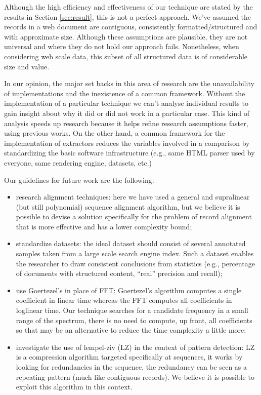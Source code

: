 \documentclass{vldb}
\begin{document}
Although the high efficiency and effectiveness of our technique are stated by
the results in Section \ref{sec:result}, this is not a perfect approach. We've
assumed the records in a web document are contiguous, consistently
formatted/structured and with approximate size. Although these assumptions are
plausible, they are not universal and where they do not hold our approach fails.
Nonetheless, when considering web scale data, this subset of all structured data
is of considerable size and value.

In our opinion, the major set backs in this area of research are the
unavailability of implementations and the inexistence of a common framework.
Without the implementation of a particular technique we can't analyse individual
results to gain insight about why it did or did not work in a particular case.
This kind of analysis speeds up research because it helps refine research
assumptions faster, using previous works. On the other hand, a common framework
for the implementation of extractors reduces the variables involved in a
comparison by standardizing the basic software infrastructure (e.g., same HTML
parser used by everyone, same rendering engine, datasets, etc.)
 
Our guidelines for future work are the following:
\begin{itemize}
  \item research alignment techniques: here we have used a general and
  supralinear (but still polynomial) sequence alignment algorithm, but we
  believe it is possible to devise a solution specifically for the problem of
  record alignment that is more effective and has a lower complexity bound;
  \item standardize datasets: the ideal dataset should consist of several
  annotated samples taken from a large scale search engine index. Such a dataset
  enables the researcher to draw consistent conclusions from statistics (e.g.,
  percentage of documents with structured content, ``real'' precision and
  recall);
  \item use Goertezel's in place of FFT: Goertezel's algorithm computes a single
  coefficient in linear time whereas the FFT computes all coefficients in
  loglinear time. Our technique searches for a candidate frequency in a small
  range of the spectrum, there is no need to compute, up front, all coefficients
  so that may be an alternative to reduce the time complexity a little more;
  \item investigate the use of lempel-ziv\cite{ziv1977universal} (LZ) in the context of
  pattern detection: LZ is a compression algorithm targeted specifically at sequences,
  it works by looking for redundancies in the sequence, the redundancy can be
  seen as a repeating pattern (much like contiguous records). We believe it is
  possible to exploit this algorithm in this context.
\end{itemize}
 
\balance 



\end{document}
